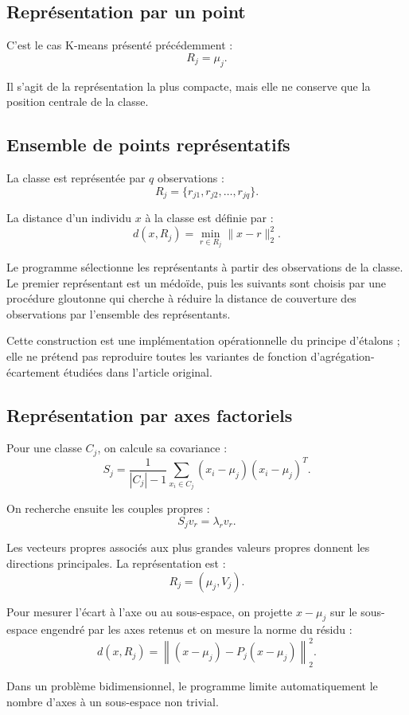 \documentclass[12pt,a4paper]{article}
\begin{document}
\subsection{Représentation par un point}

C'est le cas K-means présenté précédemment :
\[
R_j=\mu_j.
\]

Il s'agit de la représentation la plus compacte, mais elle ne conserve que la position centrale de la classe.

\subsection{Ensemble de points représentatifs}

La classe est représentée par $q$ observations :
\[
R_j=\{r_{j1},r_{j2},\ldots,r_{jq}\}.
\]

La distance d'un individu $x$ à la classe est définie par :
\[
d(x,R_j)=\min_{r\in R_j}\|x-r\|_2^2.
\]

Le programme sélectionne les représentants à partir des observations de la classe. Le premier représentant est un médoïde, puis les suivants sont choisis par une procédure gloutonne qui cherche à réduire la distance de couverture des observations par l'ensemble des représentants.

Cette construction est une implémentation opérationnelle du principe d'étalons ; elle ne prétend pas reproduire toutes les variantes de fonction d'agrégation-écartement étudiées dans l'article original.

\subsection{Représentation par axes factoriels}

Pour une classe $C_j$, on calcule sa covariance :
\[
S_j=\frac{1}{|C_j|-1}
\sum_{x_i\in C_j}(x_i-\mu_j)(x_i-\mu_j)^T.
\]

On recherche ensuite les couples propres :
\[
S_jv_r=\lambda_rv_r.
\]

Les vecteurs propres associés aux plus grandes valeurs propres donnent les directions principales. La représentation est :
\[
R_j=(\mu_j,V_j).
\]

Pour mesurer l'écart à l'axe ou au sous-espace, on projette $x-\mu_j$ sur le sous-espace engendré par les axes retenus et on mesure la norme du résidu :
\[
d(x,R_j)=\left\|(x-\mu_j)-P_j(x-\mu_j)\right\|_2^2.
\]

Dans un problème bidimensionnel, le programme limite automatiquement le nombre d'axes à un sous-espace non trivial.
\end{document}
